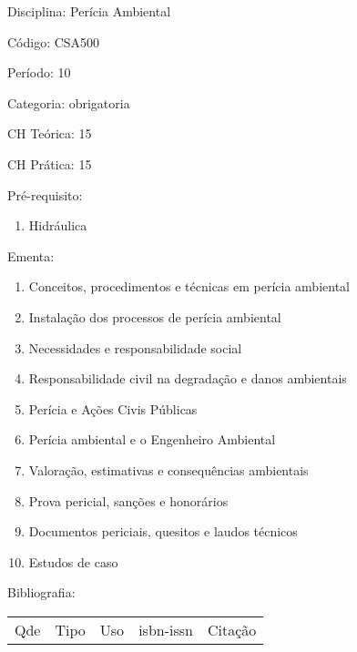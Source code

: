 \documentclass[12pt,a4paper,twoside]{report}
\begin{document}
Disciplina: Perícia Ambiental

Código: CSA500

Período: 10

Categoria: obrigatoria

CH Teórica: 15

CH Prática: 15




Pré-requisito:
\begin{enumerate}
\item Hidráulica
\end{enumerate}

Ementa:
\begin{enumerate}
\item Conceitos, procedimentos e técnicas em perícia ambiental
\item Instalação dos processos de perícia ambiental
\item Necessidades e responsabilidade social
\item Responsabilidade civil na degradação e danos ambientais
\item Perícia e Ações Civis Públicas
\item Perícia ambiental e o Engenheiro Ambiental
\item Valoração, estimativas e consequências ambientais
\item Prova pericial, sanções e honorários
\item Documentos periciais, quesitos e laudos técnicos
\item Estudos de caso
\end{enumerate}



Bibliografia:


\begin{tabular}{llllp{8cm}}
Qde & Tipo & Uso & isbn-issn & Citação \\
\end{tabular}
\end{document}
